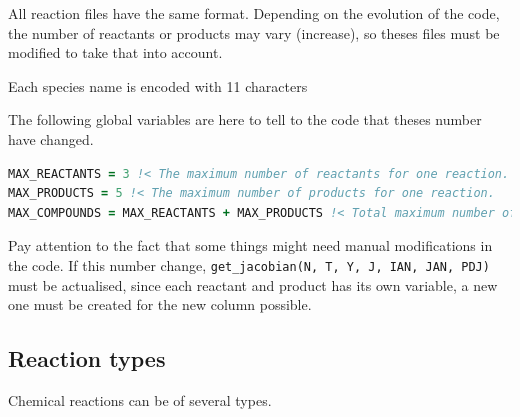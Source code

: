 \documentclass[english,a4paper,twoside]{article}
\begin{document}
All reaction files have the same format. Depending on the evolution of the code, the number of reactants or products may vary (increase), so theses files must be modified to take that into account. 

Each species name is encoded with 11 characters

The following global variables are here to tell to the code that theses number have changed. 
\begin{lstlisting}[language=Fortran]
MAX_REACTANTS = 3 !< The maximum number of reactants for one reaction.
MAX_PRODUCTS = 5 !< The maximum number of products for one reaction.
MAX_COMPOUNDS = MAX_REACTANTS + MAX_PRODUCTS !< Total maximum number of compounds for one reaction (reactants + products)
\end{lstlisting}



\begin{attention}
Pay attention to the fact that some things might need manual modifications in the code. If this number change, \verb|get_jacobian(N, T, Y, J, IAN, JAN, PDJ)| must be actualised, since each reactant and product has its own variable, a new one must be created for the new column possible. 
\end{attention}

\subsection{Reaction types}
Chemical reactions can be of several types. 
\end{document}
